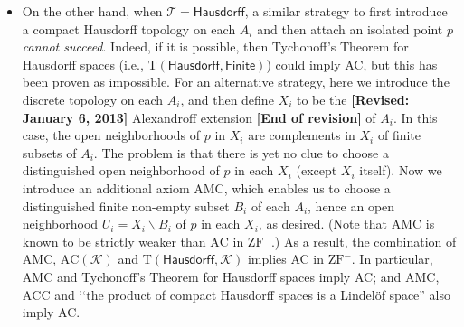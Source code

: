 \documentclass{article}
\begin{document}
\begin{itemize}
\item On the other hand, when $\mathcal{T} = \mathsf{Hausdorff}$, a similar strategy to first introduce a compact Hausdorff topology on each $A_i$ and then attach an isolated point $p$ \emph{cannot succeed}.
Indeed, if it is possible, then Tychonoff's Theorem for Hausdorff spaces (i.e., $\mathrm{T}(\mathsf{Hausdorff},\mathsf{Finite})$) could imply AC, but this has been proven as impossible.
For an alternative strategy, here we introduce the discrete topology on each $A_i$, and then define $X_i$ to be the \textbf{[Revised: January 6, 2013]} Alexandroff extension \textbf{[End of revision]} of $A_i$.
In this case, the open neighborhoods of $p$ in $X_i$ are complements in $X_i$ of finite subsets of $A_i$.
The problem is that there is yet no clue to choose a distinguished open neighborhood of $p$ in each $X_i$ (except $X_i$ itself).
Now we introduce an additional axiom $\mathrm{AMC}$, which enables us to choose a distinguished finite non-empty subset $B_i$ of each $A_i$, hence an open neighborhood $U_i = X_i \smallsetminus B_i$ of $p$ in each $X_i$, as desired.
(Note that $\mathrm{AMC}$ is known to be strictly weaker than $\mathrm{AC}$ in $\mathrm{ZF}^-$.)
As a result, the combination of $\mathrm{AMC}$, $\mathrm{AC}(\mathcal{K})$ and $\mathrm{T}(\mathsf{Hausdorff},\mathcal{K})$ implies AC in $\mathrm{ZF}^-$.
In particular, $\mathrm{AMC}$ and Tychonoff's Theorem for Hausdorff spaces imply AC; and $\mathrm{AMC}$, $\mathrm{ACC}$ and \lq\lq the product of compact Hausdorff spaces is a Lindel\"{o}f space'' also imply AC.
\end{itemize}
\end{document}

